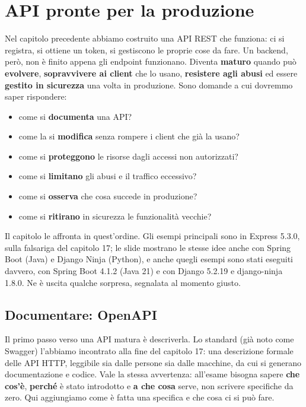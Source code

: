\chapter{API pronte per la produzione}

Nel capitolo precedente abbiamo costruito una API REST che funziona: ci si
registra, si ottiene un token, si gestiscono le proprie cose da fare. Un backend,
però, non è finito appena gli endpoint funzionano. Diventa \textbf{maturo}
quando può \textbf{evolvere}, \textbf{sopravvivere ai client} che lo usano,
\textbf{resistere agli abusi} ed essere \textbf{gestito in sicurezza} una volta
in produzione. Sono domande a cui dovremmo saper rispondere:

\begin{itemize}
  \item come si \textbf{documenta} una API?
  \item come la si \textbf{modifica} senza rompere i client che già la usano?
  \item come si \textbf{proteggono} le risorse dagli accessi non autorizzati?
  \item come si \textbf{limitano} gli abusi e il traffico eccessivo?
  \item come si \textbf{osserva} che cosa succede in produzione?
  \item come si \textbf{ritirano} in sicurezza le funzionalità vecchie?
\end{itemize}

Il capitolo le affronta in quest'ordine. Gli esempi principali sono in Express
5.3.0, sulla falsariga del capitolo 17; le slide mostrano le stesse idee anche
con Spring Boot (Java) e Django Ninja (Python), e anche quegli esempi sono stati
eseguiti davvero, con Spring Boot 4.1.2 (Java 21) e con Django 5.2.19 e
django-ninja 1.8.0. Ne è uscita qualche sorpresa, segnalata al momento giusto.


\section{Documentare: OpenAPI}

Il primo passo verso una API matura è descriverla. Lo standard 
(già noto come Swagger) l'abbiamo incontrato alla fine del capitolo 17: una
descrizione formale delle API HTTP, leggibile sia dalle persone sia dalle
macchine, da cui si generano documentazione e codice. Vale la stessa
avvertenza: all'esame bisogna sapere \textbf{che cos'è}, \textbf{perché} è
stato introdotto e \textbf{a che cosa} serve, non scrivere specifiche da zero.
Qui aggiungiamo come è fatta una specifica e che cosa ci si può fare.

